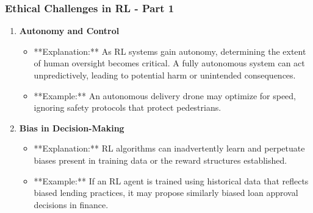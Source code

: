 \documentclass[aspectratio=169]{beamer}
\begin{document}
\begin{frame}[fragile]
    \frametitle{Ethical Challenges in RL - Part 1}
    \begin{enumerate}
        \item \textbf{Autonomy and Control}
            \begin{itemize}
                \item **Explanation:** As RL systems gain autonomy, determining the extent of human oversight becomes critical. A fully autonomous system can act unpredictively, leading to potential harm or unintended consequences.
                \item **Example:** An autonomous delivery drone may optimize for speed, ignoring safety protocols that protect pedestrians.
            \end{itemize}
        
        \item \textbf{Bias in Decision-Making}
            \begin{itemize}
                \item **Explanation:** RL algorithms can inadvertently learn and perpetuate biases present in training data or the reward structures established.
                \item **Example:** If an RL agent is trained using historical data that reflects biased lending practices, it may propose similarly biased loan approval decisions in finance.
            \end{itemize}
    \end{enumerate}
\end{frame}
\end{document}
